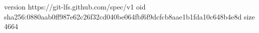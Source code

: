 version https://git-lfs.github.com/spec/v1
oid sha256:0880aab0ff987e62c26f32cd040be064fbf6f9dcfcb8aae1b1fda10c648b4e8d
size 4664
